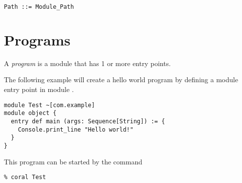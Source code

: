 \syntax\begin{lstlisting}
Path ::= Module_Path
\end{lstlisting}





\section{Programs}

A {\em program} is a module that has 1 or more entry points. 

\example The following example will create a hello world program by defining a module entry point in module . 

\syntax\begin{lstlisting}[morekeywords={entry}]
module Test ~[com.example]
module object {
  entry def main (args: Sequence[String]) := {
    Console.print_line "Hello world!"
  }
}
\end{lstlisting}

This program can be started by the command
\begin{lstlisting}
% coral Test
\end{lstlisting}








